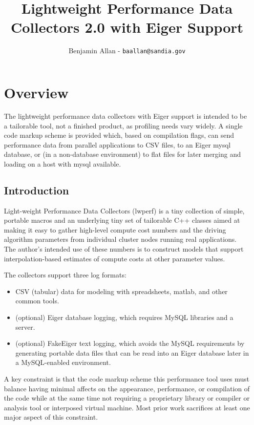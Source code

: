 \documentclass{article}
\title{\textbf{Lightweight Performance Data Collectors 2.0 with Eiger Support}}
\author{Benjamin Allan - \texttt{baallan@sandia.gov}}
\date{}
\begin{document}
\maketitle
\tableofcontents
\clearpage
\section{Overview}
The lightweight performance data collectors with Eiger support is intended to be a tailorable tool, not a finished product, as profiling needs vary widely. A single code markup scheme is provided which, based on compilation flags, can send performance data from parallel applications to CSV files, to an Eiger mysql database, or (in a non-database environment) to flat files for later merging and loading on a host with mysql available.

\label{sec:over}
\subsection{Introduction}
Light-weight Performance Data Collectors (lwperf) is a tiny collection of simple, portable macros and an underlying tiny set of tailorable C++ classes aimed at making it easy to gather high-level compute cost numbers and the driving algorithm parameters from individual cluster nodes running real applications. The author's intended use of these numbers is to construct models that support interpolation-based estimates of compute costs at other parameter values. 

The collectors support three log formats: 
\begin{itemize}
\item CSV (tabular) data for modeling with spreadsheets, matlab, and other common tools.
\item (optional) Eiger\cite{eiger} database logging, which requires MySQL libraries and a server.
\item (optional) FakeEiger text logging, which avoids the MySQL requirements by generating portable data files that can be read into an Eiger database later in a MySQL-enabled environment.
\end{itemize}

A key constraint is that the code markup scheme this performance tool uses must balance having minimal affects on the appearance, performance, or compilation of the code while at the same time not requiring a proprietary library or compiler or analysis tool or interposed virtual machine. Most prior work sacrifices at least one major aspect of this constraint.
\end{document}
